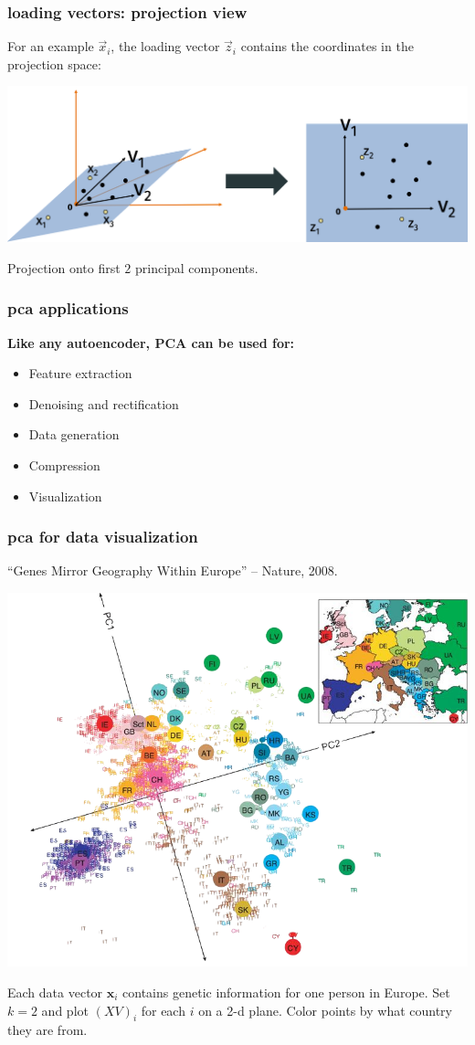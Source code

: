 \documentclass[handout,compress]{beamer}
\newcommand{\bv}[1]{\mathbf{#1}}
\begin{document}
\begin{frame}[t]
	\frametitle{loading vectors: projection view}
	For an example $\vec{x}_i$, the loading vector $\vec{z}_i$ contains the coordinates in the projection space:
	\begin{center}
		\includegraphics[width=\textwidth]{reparam.png}
		
		Projection onto first $2$ principal components.
		
	\end{center}
	
\end{frame}

\begin{frame}
	\frametitle{pca applications}
	\textbf{Like any autoencoder, PCA can be used for:}
	\begin{itemize}
		\item Feature extraction
		\item Denoising and rectification
		\item Data generation
		\item Compression
		\item Visualization
	\end{itemize}
\end{frame}

\begin{frame}
	\frametitle{pca for data visualization}
	``Genes Mirror Geography Within Europe'' -- Nature, 2008.
	\begin{center}
		\includegraphics[width=.65\textwidth]{genes_pca.png}
	\end{center}
	\vspace{-.5em}
	\small
	Each data vector $\bv{x}_i$ contains genetic information for one person in Europe. Set $k = 2$ and plot $(XV)_i$ for each $i$ on a 2-d plane. Color points by what country they are from.  
\end{frame}
\end{document}
